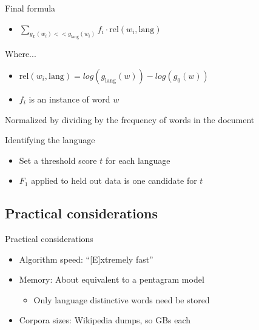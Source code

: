 \documentclass{beamer}
\begin{document}
      \begin{frame}{\subseven}
        \begin{block}{Final formula}
          \begin{itemize}
            \item[] $\sum_{g_{L}(w_i)<<g_{\text{lang}}(w_i)}f_i \cdot \text{rel}(w_i, \text{lang})$
          \end{itemize}
          Where...
          \begin{itemize}
            \item[] $\text{rel}(w_i, \text{lang}) = log(g_{\text{lang}}(w)) - log(g_{0}(w))$
            \item[] $f_i$ is an instance of word $w$
          \end{itemize}
          Normalized by dividing by the frequency of words in the document
        \end{block}
      \end{frame}

      \begin{frame}{\subseven}
        \begin{block}{Identifying the language}
          \begin{itemize}
            \item Set a threshold score $t$ for each language
            \item $F_1$ applied to held out data is one candidate for $t$
          \end{itemize}
        \end{block}
      \end{frame}

    \newcommand{\subeight}{Practical considerations}
    \subsection{\subeight}
      \begin{frame}{\subeight}
        \begin{block}{}
          \begin{itemize}
            \item Algorithm speed: ``[E]xtremely fast''
            \item Memory: About equivalent to a pentagram model
            \begin{itemize}
              \item Only language distinctive words need be stored
            \end{itemize}
            \item Corpora sizes: Wikipedia dumps, so GBs each
          \end{itemize}
        \end{block}
      \end{frame}
\end{document}
